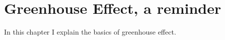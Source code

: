 \setchapterpreamble[u]{\margintoc}
\chapter{Greenhouse Effect, a reminder}

In this chapter I explain the basics of greenhouse effect.